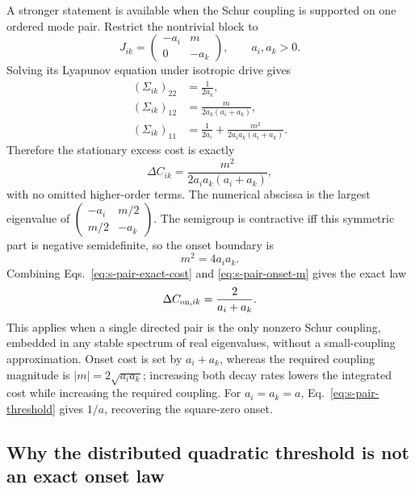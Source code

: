 \documentclass[
  aps,prl,preprint,notitlepage,superscriptaddress,nofootinbib,longbibliography,
  amsmath,amssymb
]{revtex4-2}
\begin{document}
A stronger statement is available when the Schur coupling is supported on one
ordered mode pair.  Restrict the nontrivial block to
\begin{equation}
J_{ik}=\begin{pmatrix}-a_i&m\\0&-a_k\end{pmatrix},
\qquad a_i,a_k>0.
\label{eq:s-pair-generator}
\end{equation}
Solving its Lyapunov equation under isotropic drive gives
\begin{align}
(\Sigma_{ik})_{22}&=\frac{1}{2a_k},\\
(\Sigma_{ik})_{12}&=\frac{m}{2a_k(a_i+a_k)},\\
(\Sigma_{ik})_{11}&=\frac{1}{2a_i}
+\frac{m^2}{2a_i a_k(a_i+a_k)}.
\end{align}
Therefore the stationary excess cost is exactly
\begin{equation}
\Delta C_{ik}=\frac{m^2}{2a_i a_k(a_i+a_k)},
\label{eq:s-pair-exact-cost}
\end{equation}
with no omitted higher-order terms.  The numerical abscissa is the largest
eigenvalue of
$\left(\begin{smallmatrix}-a_i&m/2\\m/2&-a_k\end{smallmatrix}\right)$.
The semigroup is contractive iff this symmetric part is negative semidefinite,
so the onset boundary is
\begin{equation}
m^2=4a_i a_k.
\label{eq:s-pair-onset-m}
\end{equation}
Combining Eqs.~\eqref{eq:s-pair-exact-cost} and
\eqref{eq:s-pair-onset-m} gives the exact law
\begin{equation}
\Delta C_{{\rm on},ik}=\frac{2}{a_i+a_k}.
\label{eq:s-pair-threshold}
\end{equation}
This applies when a single directed pair is the only nonzero Schur coupling,
embedded in any stable spectrum of real eigenvalues, without a small-coupling
approximation.  Onset cost is set by $a_i+a_k$, whereas the required coupling
magnitude is $|m|=2\sqrt{a_i a_k}$; increasing both decay rates lowers the
integrated cost while increasing the required coupling.  For $a_i=a_k=a$,
Eq.~\eqref{eq:s-pair-threshold} gives $1/a$, recovering the square-zero onset.

\subsection{Why the distributed quadratic threshold is not an exact onset law}
\label{sec:s-quad-domain}
\end{document}
